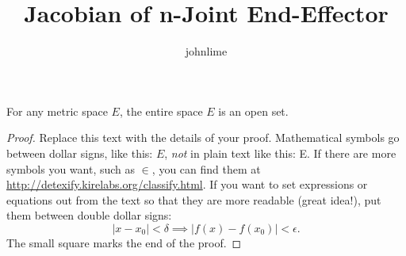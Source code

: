 \documentclass{article}
\newenvironment{theorem}[2][Theorem]{\begin{trivlist}
\item[\hskip \labelsep {\bfseries #1}\hskip \labelsep {\bfseries #2.}]}{\end{trivlist}}
\begin{document}

\title{Jacobian of n-Joint End-Effector} %
\author{johnlime} %

\maketitle

%

\begin{theorem}{(Page 4 $\#$ 6)}
For any metric space $E$, the entire space $E$ is an open set.
\end{theorem}

\begin{proof}
Replace this text with the details of your proof. Mathematical symbols go between dollar signs, like this: $E$, \emph{not} in plain text like this: E. If there are more symbols you want, such as $\in$, you can find them at\\ \url{http://detexify.kirelabs.org/classify.html}. If you want to set expressions or equations out from the text so that they are more readable (great idea!), put them between double dollar signs: $$|x-x_0| < \delta \implies |f(x)-f(x_0)| < \epsilon.$$
The small square marks the end of the proof.
\end{proof}


\end{document}
